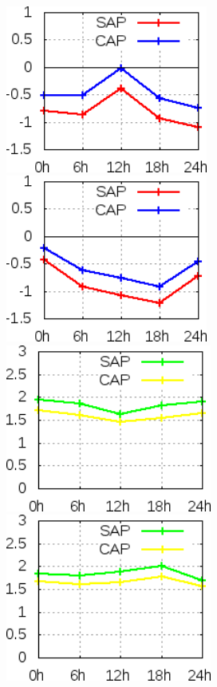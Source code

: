 \begin{figure}[!hbp]
\includegraphics[height=5.5cm]{./figs/VIES250temp0Z.png}\includegraphics[height=5.5cm]{./figs/VIES250temp12Z.png}
\includegraphics[height=5.5cm]{./figs/EQM250temp0Z.png}\includegraphics[height=5.5cm]{./figs/EQM250temp12Z.png}

\end{figure}
